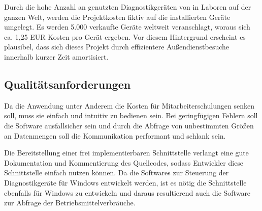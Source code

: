 Durch die hohe Anzahl an genutzten Diagnostikgeräten von {\betriebNameKzf} in Laboren auf der ganzen Welt, werden die Projektkosten fiktiv auf die installierten Geräte umgelegt. Es werden 5.000 verkaufte Geräte weltweit veranschlagt, woraus sich ca. 1,25 EUR Kosten pro Gerät ergeben. Vor diesem Hintergrund erscheint es plausibel, dass sich dieses Projekt durch effizientere Außendienstbesuche innerhalb kurzer Zeit amortisiert.

\subsection{Qualitätsanforderungen}
\label{sec:Qualitätsanforderungen}
Da die Anwendung unter Anderem die Kosten für Mitarbeiterschulungen senken soll, muss sie einfach und intuitiv zu bedienen sein. Bei geringfügigen Fehlern soll die Software ausfallsicher sein und durch die Abfrage von unbestimmten Größen an Datenmengen soll die Kommunikation performant und schlank sein.

Die Bereitstellung einer frei implementierbaren Schnittstelle verlangt eine gute Dokumentation und Kommentierung des Quellcodes, sodass Entwickler diese Schnittstelle einfach nutzen können. Da die Softwares zur Steuerung der Diagnostikgeräte für Windows entwickelt werden, ist es nötig die Schnittstelle ebenfalls für Windows zu entwickeln und daraus resultierend auch die Software zur Abfrage der Betriebsmittelverbräuche.